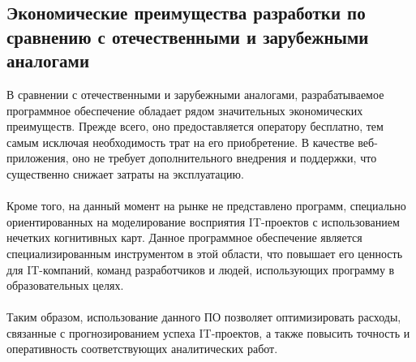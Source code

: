 \documentclass{article}
\begin{document}
    \subsection {Экономические преимущества разработки по сравнению с отечественными и зарубежными аналогами}
    В сравнении с отечественными и зарубежными аналогами, разрабатываемое программное обеспечение обладает рядом значительных экономических преимуществ. Прежде всего, оно предоставляется оператору бесплатно, тем самым исключая необходимость трат на его приобретение. В качестве веб-приложения, оно не требует дополнительного внедрения и поддержки, что существенно снижает затраты на эксплуатацию.\\
    ~\\
    Кроме того, на данный момент на рынке не представлено программ, специально ориентированных на моделирование восприятия IT-проектов с использованием нечетких когнитивных карт. Данное программное обеспечение является специализированным инструментом в этой области, что повышает его ценность для IT-компаний, команд разработчиков и людей, использующих программу в образовательных целях.\\
    ~\\
    Таким образом, использование данного ПО позволяет оптимизировать расходы, связанные с прогнозированием успеха IT-проектов, а также повысить точность и оперативность соответствующих аналитических работ.
    \newpage
\end{document}
